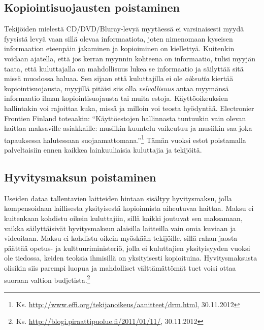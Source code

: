 \documentclass[titlepage,12pt]{article}
\begin{document}
\subsection{Kopiointisuojausten poistaminen}

Tekijöiden mielestä CD/DVD/Bluray-levyä myytäessä ei varsinaisesti
myydä fyysistä levyä vaan sillä olevaa informaatiota, joten nimenomaan
kyseisen informaation eteenpäin jakaminen ja kopioiminen on
kiellettyä.  Kuitenkin voidaan ajatella, että jos kerran myynnin
kohteena on informaatio, tulisi myyjän taata, että kuluttajalla on
mahdollisuus lukea se informaatio ja säilyttää sitä missä muodossa
haluaa.  Sen sijaan että kuluttajilla ei ole \emph{oikeutta} kiertää
kopiointisuojausta, myyjillä pitäisi siis olla \emph{velvollisuus}
antaa myymänsä informaatio ilman kopiointisuojausta tai muita estoja.
%
%
%
%
Käyttöoikeuksien hallintakin voi rajoittaa kuka, missä ja milloin voi
teosta hyödyntää.  Electronier Frontien Finland toteaakin:
``Käyttöestojen hallinnasta tuntuukin vain olevan haittaa maksaville
asiakkaille: musiikin kuuntelu vaikeutuu ja musiikin saa joka
tapauksessa halutessaan
suojaamattomana.''\footnote{Ks. \url{http://www.effi.org/tekijanoikeus/aanitteet/drm.html},
  30.11.2012} Tämän vuoksi estot poistamalla palveltaisiin ennen
kaikkea lainkuuliaisia kuluttajia ja tekijöitä.




\subsection{Hyvitysmaksun poistaminen}

Useiden dataa tallentavien laitteiden hintaan sisältyy hyvitysmaksu,
jolla kompensoidaan laillisesta yksityisestä kopioinnista aiheutuvaa
haittaa.  Maksu ei kuitenkaan kohdistu oikein kuluttajiin, sillä
kaikki joutuvat sen maksamaan, vaikka säilyttäisivät hyvitysmaksun
alaisilla laitteilla vain omia kuviaan ja videoitaan.  Maksu ei
kohdistu oikein myöskään tekijöille, sillä rahan jaosta päättää
opetus- ja kulttuuriministeriö, jolla ei kuluttajien yksityisyyden
vuoksi ole tiedossa, keiden teoksia ihmisillä on yksityisesti
kopioituina.  Hyvitysmaksusta olisikin siis parempi luopua ja
mahdolliset välttämättömät tuet voisi ottaa suoraan valtion
budjetista.\footnote{Ks. \url{http://blogi.piraattipuolue.fi/2011/01/11/},
  30.11.2012}
\end{document}
